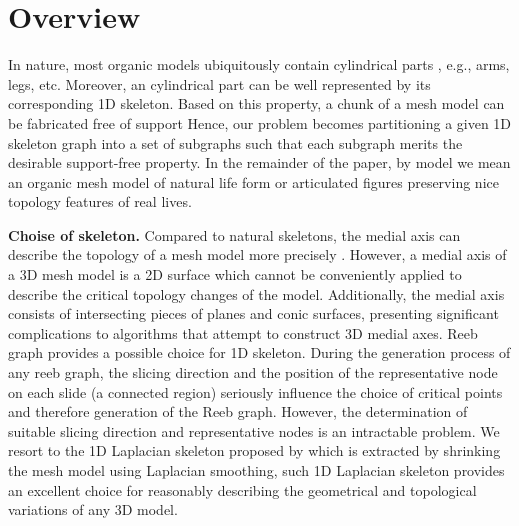 \section{Overview}

In nature, most organic models ubiquitously contain cylindrical parts \cite{Zhou:2015:GCD}, e.g., arms, legs, etc. Moreover, an cylindrical part can be well represented by its corresponding 1{D} skeleton. Based on this property, a chunk of a mesh model can be fabricated free of support  Hence, our problem becomes partitioning a given 1{D} skeleton graph into a set of subgraphs such that each subgraph merits the desirable support-free property. In the remainder of the paper, by model we mean an organic mesh model of natural life form or articulated figures preserving nice topology features of real lives.

\textbf{Choise of skeleton.} Compared to natural skeletons, the medial axis can describe the topology of a mesh model more precisely \cite{ZhangXWYTW15}. However, a medial axis of a 3D mesh model is a 2D surface which cannot be conveniently applied to describe the critical topology changes of the model. Additionally, the medial axis consists of intersecting pieces of planes and conic surfaces, presenting significant complications to algorithms that attempt to construct 3D medial axes.
Reeb graph provides a possible choice for 1D skeleton. During the generation process of any reeb graph, the slicing direction and the position of the representative node on each slide (a connected region) seriously influence the choice of critical points and therefore generation of the Reeb graph. However, the determination of suitable slicing direction and representative nodes is an intractable problem. We resort to the 1D Laplacian skeleton proposed by \cite{AuTCCL08} which is extracted by shrinking the mesh model using Laplacian smoothing, such 1D Laplacian skeleton provides an excellent choice for reasonably describing the geometrical and topological variations of any 3{D} model.






